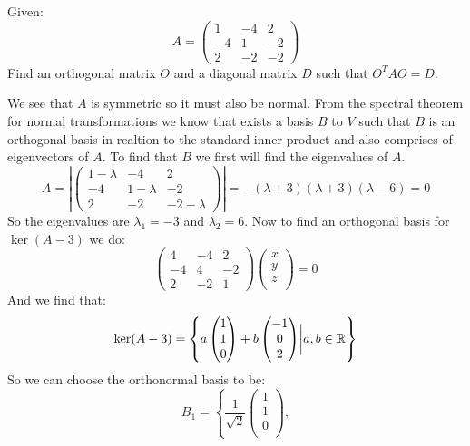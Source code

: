 \documentclass[11pt, a4paper]{article}
\begin{document}
\begin{exercise}
Given:
\[
A = 
  \begin{pmatrix}
  1 & -4 & 2 \\
  -4 & 1 & -2 \\
  2 & -2 & -2 
  \end{pmatrix}
\]
Find an orthogonal matrix $O$ and a diagonal matrix $D$ such
that $O^{T}AO=D$.
\end{exercise}
\begin{solution}
We see that $A$ is symmetric so it must also be normal. From the spectral
theorem for normal transformations we know that exists a basis $B$ to $V$
such that $B$ is an orthogonal basis in realtion to the standard inner
product and also comprises of eigenvectors of $A$. To find that $B$ we
first will find the eigenvalues of $A$.
\[
A = 
  \left\vert
  \begin{pmatrix}
  1-\lambda & -4 & 2 \\
  -4 & 1-\lambda & -2 \\
  2 & -2 & -2-\lambda 
  \end{pmatrix}
  \right\vert = -(\lambda+3)(\lambda+3)(\lambda-6) = 0
\]
So the eigenvalues are $\lambda_1 = -3$ and $\lambda_2=6$. Now to find
an orthogonal basis for $\ker(A-3)$ we do:
\[
  \begin{pmatrix}
  4 & -4 & 2 \\
  -4 & 4 & -2 \\
  2 & -2 & 1 
  \end{pmatrix}
  \begin{pmatrix}
  x \\ y \\ z \\
  \end{pmatrix} = 0
\]
And we find that:
\[
  \ker(A-3) = 
  \left\{
  a\begin{pmatrix} 1\\ 1\\ 0\\ \end{pmatrix} + 
  b\begin{pmatrix} -1\\ 0\\ 2\\ \end{pmatrix}
  \biggr\vert a,b\in\mathbb{R}
  \right\}
\]
So we can choose the orthonormal basis to be:
\[
  B_{1} = 
  \left\{
  \frac{1}{\sqrt{2}} \begin{pmatrix} 1\\ 1\\ 0\\ \end{pmatrix}, 
\]
\end{solution}
\end{document}

